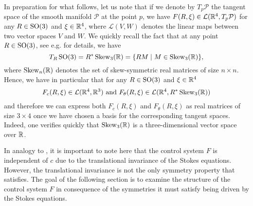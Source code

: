 In preparation for what follows, let us note that if we denote by $T_p \mathcal{P}$ the tangent space of the smooth manifold $\mathcal{P}$ at the point $p$, we have $F(R, \xi) \in \mathcal{L}(\mathbb{R}^4, T_{p}\mathcal{P})$ for any $R \in \operatorname{SO}(3)$ and $\xi \in \mathbb{R}^4$, where $\mathcal{L}(V, W)$ denotes the linear maps between two vector spaces $V$ and $W$. We quickly recall the fact that at any point $R \in \operatorname{SO}(3)$, see e.g. \cite{Hall2015} for details, we have 
\begin{equation}
	T_R \operatorname{SO}(3) = R^* \operatorname{Skew}_3(\mathbb{R}) = \{R M \mid M \in \operatorname{Skew}_3(\mathbb{R})\},
\end{equation}
where $\operatorname{Skew}_n(\mathbb{R})$ denotes the set of skew-symmetric real matrices of size $n \times n$. Hence, we have in particular that for any $R \in \operatorname{SO}(3)$ and $\xi \in \mathbb{R}^4$
\begin{equation}
\begin{aligned}
	F_c(R, \xi) \in \mathcal{L}(\mathbb{R}^4, \mathbb{R}^3) \text{ and } F_{\theta}(R, \xi) \in \mathcal{L}(\mathbb{R}^4, R^* \operatorname{Skew}_3(\mathbb{R}))
\end{aligned}
\end{equation}
and therefore we can express both $F_c(R, \xi)$ and $F_{\theta}(R, \xi)$ as real matrices of size $3 \times 4$ once we have chosen a basis for the corresponding tangent spaces. Indeed, one verifies quickly that $\operatorname{Skew}_3(\mathbb{R})$ is a three-dimensional vector space over $\mathbb{R}$.


 In analogy to \cite{Alouges2017}, it is important to note here that the control system $F$ is independent of $c$ due to the translational invariance of the Stokes equations. However, the translational invariance is not the only symmetry property that \spr satisfies. The goal of the following section is to examine the structure of the control system $F$ in consequence of the symmetries it must satisfy being driven by the Stokes equations.





























